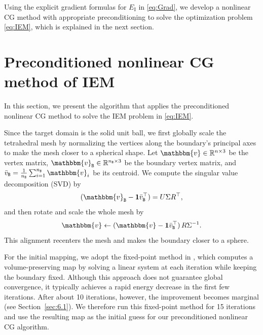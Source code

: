\documentclass[11pt,a4paper]{article}
\def\bv{\mathbbm{v}}
\begin{document}
Using the explicit gradient formulas for $E_\mathrm{I}$ in \eqref{eq:Grad}, we develop a nonlinear CG method with appropriate preconditioning to solve the optimization problem \eqref{eq:IEM}, which is explained in the next section.






\section{Preconditioned nonlinear CG method of IEM}
\label{sec:4}


In this section, we present the algorithm that applies the preconditioned nonlinear CG method to solve the IEM problem in \eqref{eq:IEM}.


Since the target domain is the solid unit ball, we first globally scale the tetrahedral mesh by normalizing the vertices along the boundary's principal axes to make the mesh closer to a spherical shape. Let $\bv\in\mathbb{R}^{n\times 3}$ be the vertex matrix, $\bv_\B\in\mathbb{R}^{n_\B\times 3}$ be the boundary vertex matrix, and $\bar v_\B=\tfrac{1}{n_\B}\sum_{i=1}^{n_\B}\bv_i$ be its centroid. We compute the singular value decomposition (SVD) by
\[
(\bv_\B - \mathbf{1}\bar v_\B^\top) = U\Sigma R^\top,
\]
and then rotate and scale the whole mesh by
\begin{equation} \label{eq:AST}
\bv \leftarrow (\bv - \mathbf{1}\bar v_\B^\top) \, R \Sigma^{-1}.
\end{equation}
This alignment recenters the mesh and makes the boundary closer to a sphere.


For the initial mapping, we adopt the fixed-point method in \cite[Algorithm 4.4]{YuLL19}, which computes a volume-preserving map by solving a linear system at each iteration while keeping the boundary fixed. Although this approach does not guarantee global convergence, it typically achieves a rapid energy decrease in the first few iterations. After about 10 iterations, however, the improvement becomes marginal (see Section~\ref{sec:6.1}). We therefore run this fixed-point method for 15 iterations and use the resulting map as the initial guess for our preconditioned nonlinear CG algorithm.
\end{document}
